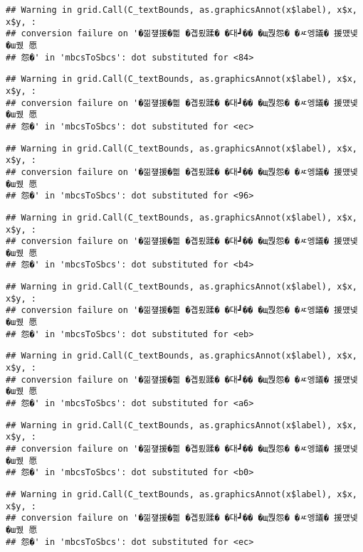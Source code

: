 \documentclass[
]{article}
\begin{document}
\begin{verbatim}
## Warning in grid.Call(C_textBounds, as.graphicsAnnot(x$label), x$x, x$y, :
## conversion failure on '�낆쟾援�쁾 �곕룄蹂� �대┛�� �щ쭩怨� �ㅼ엥議� 援먰넻�ш퀬 愿
## 怨�' in 'mbcsToSbcs': dot substituted for <84>
\end{verbatim}

\begin{verbatim}
## Warning in grid.Call(C_textBounds, as.graphicsAnnot(x$label), x$x, x$y, :
## conversion failure on '�낆쟾援�쁾 �곕룄蹂� �대┛�� �щ쭩怨� �ㅼ엥議� 援먰넻�ш퀬 愿
## 怨�' in 'mbcsToSbcs': dot substituted for <ec>
\end{verbatim}

\begin{verbatim}
## Warning in grid.Call(C_textBounds, as.graphicsAnnot(x$label), x$x, x$y, :
## conversion failure on '�낆쟾援�쁾 �곕룄蹂� �대┛�� �щ쭩怨� �ㅼ엥議� 援먰넻�ш퀬 愿
## 怨�' in 'mbcsToSbcs': dot substituted for <96>
\end{verbatim}

\begin{verbatim}
## Warning in grid.Call(C_textBounds, as.graphicsAnnot(x$label), x$x, x$y, :
## conversion failure on '�낆쟾援�쁾 �곕룄蹂� �대┛�� �щ쭩怨� �ㅼ엥議� 援먰넻�ш퀬 愿
## 怨�' in 'mbcsToSbcs': dot substituted for <b4>
\end{verbatim}

\begin{verbatim}
## Warning in grid.Call(C_textBounds, as.graphicsAnnot(x$label), x$x, x$y, :
## conversion failure on '�낆쟾援�쁾 �곕룄蹂� �대┛�� �щ쭩怨� �ㅼ엥議� 援먰넻�ш퀬 愿
## 怨�' in 'mbcsToSbcs': dot substituted for <eb>
\end{verbatim}

\begin{verbatim}
## Warning in grid.Call(C_textBounds, as.graphicsAnnot(x$label), x$x, x$y, :
## conversion failure on '�낆쟾援�쁾 �곕룄蹂� �대┛�� �щ쭩怨� �ㅼ엥議� 援먰넻�ш퀬 愿
## 怨�' in 'mbcsToSbcs': dot substituted for <a6>
\end{verbatim}

\begin{verbatim}
## Warning in grid.Call(C_textBounds, as.graphicsAnnot(x$label), x$x, x$y, :
## conversion failure on '�낆쟾援�쁾 �곕룄蹂� �대┛�� �щ쭩怨� �ㅼ엥議� 援먰넻�ш퀬 愿
## 怨�' in 'mbcsToSbcs': dot substituted for <b0>
\end{verbatim}

\begin{verbatim}
## Warning in grid.Call(C_textBounds, as.graphicsAnnot(x$label), x$x, x$y, :
## conversion failure on '�낆쟾援�쁾 �곕룄蹂� �대┛�� �щ쭩怨� �ㅼ엥議� 援먰넻�ш퀬 愿
## 怨�' in 'mbcsToSbcs': dot substituted for <ec>
\end{verbatim}
\end{document}
